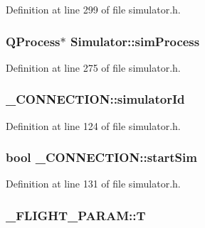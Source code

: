 Definition at line 299 of file simulator.\-h.

\hypertarget{group___h_i_t_l_plugin_ga28f5833f779eb659394e6c6cfe6f2331}{
\subsubsection[{sim\-Process}]{\setlength{\rightskip}{0pt plus 5cm}Q\-Process$\ast$ Simulator\-::sim\-Process\hspace{0.3cm}{\ttfamily [protected]}}}\label{group___h_i_t_l_plugin_ga28f5833f779eb659394e6c6cfe6f2331}


Definition at line 275 of file simulator.\-h.

\hypertarget{group___h_i_t_l_plugin_gae2769b70fdfc601ee4d7fc19c08bfe59}{
\subsubsection[{simulator\-Id}]{ \-\_\-\-C\-O\-N\-N\-E\-C\-T\-I\-O\-N\-::simulator\-Id}}\label{group___h_i_t_l_plugin_gae2769b70fdfc601ee4d7fc19c08bfe59}


Definition at line 124 of file simulator.\-h.

\hypertarget{group___h_i_t_l_plugin_ga17c6b00bf3f43c686cca76b3286ba75c}{
\subsubsection[{start\-Sim}]{\setlength{\rightskip}{0pt plus 5cm}bool \-\_\-\-C\-O\-N\-N\-E\-C\-T\-I\-O\-N\-::start\-Sim}}\label{group___h_i_t_l_plugin_ga17c6b00bf3f43c686cca76b3286ba75c}


Definition at line 131 of file simulator.\-h.

\hypertarget{group___h_i_t_l_plugin_ga6c3abbd8306a5eb69384ca36f338991b}{
\subsubsection[{T}]{ \-\_\-\-F\-L\-I\-G\-H\-T\-\_\-\-P\-A\-R\-A\-M\-::\-T}}\label{group___h_i_t_l_plugin_ga6c3abbd8306a5eb69384ca36f338991b}


